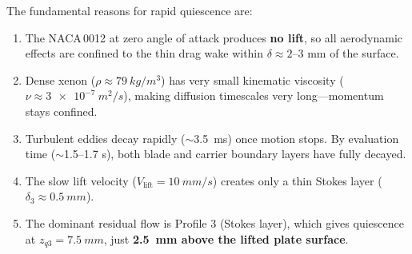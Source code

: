 \documentclass[11pt,a4paper]{article}
\begin{document}
The fundamental reasons for rapid quiescence are:
\begin{enumerate}[nosep]
  \item The NACA\,0012 at zero angle of attack produces \textbf{no lift},
    so all aerodynamic effects are confined to the thin drag wake within
    $\delta \approx 2$--3 mm of the surface.
  \item Dense xenon ($\rho \approx \SI{79}{kg/m^3}$) has very small
    kinematic viscosity ($\nu \approx \SI{3e-7}{m^2/s}$), making diffusion
    timescales very long---momentum stays confined.
  \item Turbulent eddies decay rapidly ($\sim$\SI{3.5}{ms}) once motion stops.
    By evaluation time ($\sim$1.5--1.7 s), both blade and carrier boundary
    layers have fully decayed.
  \item The slow lift velocity ($V_\mathrm{lift} = \SI{10}{mm/s}$) creates
    only a thin Stokes layer ($\delta_3 \approx \SI{0.5}{mm}$).
  \item The dominant residual flow is Profile 3 (Stokes layer), which gives
    quiescence at $z_{q3} = \SI{7.5}{mm}$, just \textbf{\SI{2.5}{mm} above
    the lifted plate surface}.
\end{enumerate}
\end{document}
